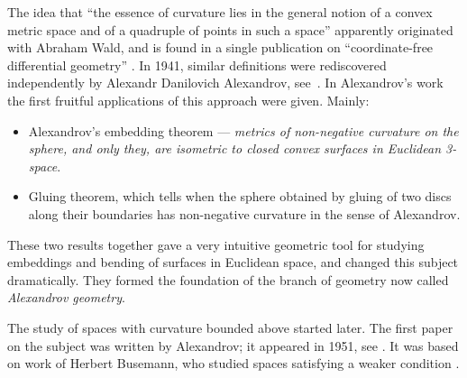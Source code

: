 The idea that ``the essence of curvature lies in the general notion of a convex metric space and of a quadruple of points in such a space'' apparently originated with Abraham Wald, and is found in a single publication  on ``coordinate-free differential geometry'' \cite{wald}.
In 1941, similar definitions were rediscovered independently by 
Alexandr Danilovich Alexandrov,
see~\cite{alexandrov:def}.
In Alexandrov's work the first fruitful applications of this approach were given.
Mainly:
\begin{itemize}
\item Alexandrov's embedding theorem --- 
\textit{metrics of non-negative curvature on the sphere, and only they, are isometric to closed convex surfaces in Euclidean 3-space}. 
\item Gluing theorem, which tells  when the sphere obtained by gluing of two discs along their boundaries has non-negative curvature in the sense of Alexandrov.
\end{itemize}
These two results together gave  a very intuitive geometric tool for studying  embeddings and bending of surfaces in  Euclidean space, and changed this subject dramatically.
They formed the foundation of the branch of geometry now called \emph{Alexandrov geometry}.

The study of  spaces with curvature bounded above started later.
The first paper on the subject was written by Alexandrov; it appeared in 1951, see \cite{alexandrov:strong-angle}.
It was based on work of Herbert Busemann, who studied spaces satisfying a weaker condition \cite{busemann-CBA}.

